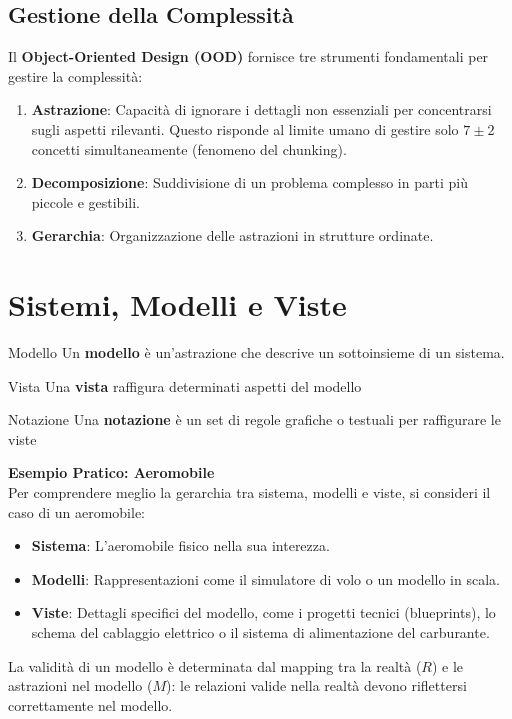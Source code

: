 \documentclass[12pt,a4paper,oneside]{book}
\begin{document}
\subsection{Gestione della Complessità}
Il \textbf{Object-Oriented Design (OOD)} fornisce tre strumenti fondamentali per gestire la complessità:
\begin{enumerate}
    \item \textbf{Astrazione}: Capacità di ignorare i dettagli non essenziali per concentrarsi sugli aspetti rilevanti. Questo risponde al limite umano di gestire solo $7 \pm 2$ concetti simultaneamente (fenomeno del chunking).
    \item \textbf{Decomposizione}: Suddivisione di un problema complesso in parti più piccole e gestibili.
    \item \textbf{Gerarchia}: Organizzazione delle astrazioni in strutture ordinate.
\end{enumerate}

\section{Sistemi, Modelli e Viste}
\begin{definition}{Modello}{}
    Un \textbf{modello} è un'astrazione che descrive un sottoinsieme di un sistema.
\end{definition}
\begin{definition}{Vista}{}
    Una \textbf{vista} raffigura determinati aspetti del modello
\end{definition}
\begin{definition}{Notazione}{}
    Una \textbf{notazione} è un set di regole grafiche o testuali per raffigurare le viste
\end{definition}
\textbf{Esempio Pratico: Aeromobile}\\
Per comprendere meglio la gerarchia tra sistema, modelli e viste, si consideri il caso di un aeromobile:
\begin{itemize}
    \item \textbf{Sistema}: L'aeromobile fisico nella sua interezza.
    \item \textbf{Modelli}: Rappresentazioni come il simulatore di volo o un modello in scala.
    \item \textbf{Viste}: Dettagli specifici del modello, come i progetti tecnici (blueprints), lo schema del cablaggio elettrico o il sistema di alimentazione del carburante.
\end{itemize}
 La validità di un modello è determinata dal mapping tra la realtà ($R$) e le astrazioni nel modello ($M$): le relazioni valide nella realtà devono riflettersi correttamente nel modello.
\end{document}
